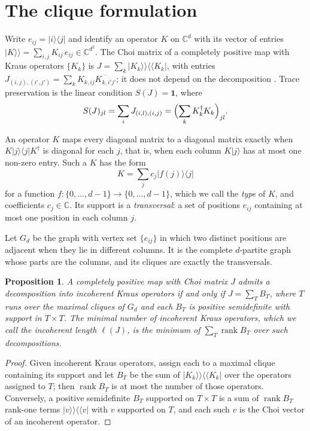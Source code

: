 \documentclass[11pt,a4paper]{article}
\newtheorem{proposition}[theorem]{Proposition}
\theoremstyle{definition}
\theoremstyle{plain}
\DeclareMathOperator{\rank}{rank}
\newcommand{\ket}[1]{\lvert#1\rangle}
\newcommand{\bra}[1]{\langle#1\rvert}
\newcommand{\kket}[1]{\lvert#1\rangle\!\rangle}
\newcommand{\bbra}[1]{\langle\!\langle#1\rvert}
\newcommand{\one}{\mathbf{1}}
\newcommand{\C}{\mathbb{C}}
\begin{document}
\section{The clique formulation}\label{sec:cliques}
Write $e_{ij}=\ket i\bra j$ and identify an operator $K$ on $\C^d$ with its
vector of entries $\kket K=\sum_{i,j}K_{ij}\,e_{ij}\in\C^{d^2}$. The Choi
matrix of a completely positive map with Kraus operators $\{K_k\}$ is
$J=\sum_k\kket{K_k}\bbra{K_k}$, with entries
$J_{(i,j),(i',j')}=\sum_kK_{k,ij}\overline{K_{k,i'j'}}$; it does not depend on
the decomposition \cite[Thm.~2]{Choi1975}. Trace preservation is the linear condition
$S(J)=\one$, where
\begin{equation}\label{eq:S}
S(J)_{jl}=\sum_iJ_{(i,l),(i,j)}=\Bigl(\sum_kK_k^\dagger K_k\Bigr)_{jl}.
\end{equation}

An operator $K$ maps every diagonal matrix to a diagonal matrix exactly when
$K\ket j\bra jK^\dagger$ is diagonal for each $j$, that is, when each column
$K\ket j$ has at most one non-zero entry. Such a $K$ has the form
\[
K=\sum_{j}c_j\ket{f(j)}\bra j
\]
for a function $f:\{0,\dots,d-1\}\to\{0,\dots,d-1\}$, which we call the
\emph{type} of $K$, and coefficients $c_j\in\C$. Its support is a
\emph{transversal}: a set of positions $e_{ij}$ containing at most one
position in each column $j$.

Let $G_d$ be the graph with vertex set $\{e_{ij}\}$ in which two distinct
positions are adjacent when they lie in different columns. It is the complete
$d$-partite graph whose parts are the columns, and its cliques are exactly
the transversals.

\begin{proposition}\label{prop:cliques}
A completely positive map with Choi matrix $J$ admits a decomposition into
incoherent Kraus operators if and only if $J=\sum_TB_T$, where $T$ runs over
the maximal cliques of $G_d$ and each $B_T$ is positive semidefinite with
support in $T\times T$. The minimal number of incoherent Kraus operators,
which we call the incoherent length $\ell(J)$, is the minimum of
$\sum_T\rank B_T$ over such decompositions.
\end{proposition}
\begin{proof}
Given incoherent Kraus operators, assign each to a maximal clique containing
its support and let $B_T$ be the sum of $\kket{K_k}\bbra{K_k}$ over the
operators assigned to $T$; then $\rank B_T$ is at most the number of those
operators. Conversely, a positive semidefinite $B_T$ supported on $T\times
T$ is a sum of $\rank B_T$ rank-one terms $\kket v\bbra v$ with $v$
supported on $T$, and each such $v$ is the Choi vector of an incoherent
operator.
\end{proof}
\end{document}
